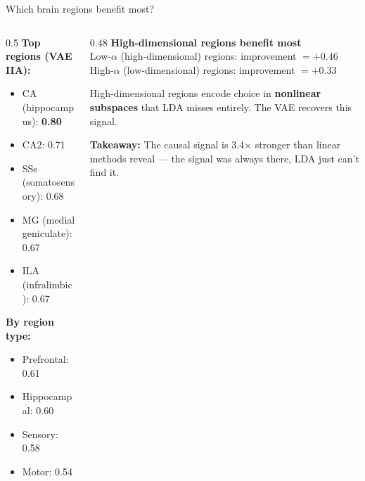 \documentclass[aspectratio=169,11pt]{beamer}
\begin{document}
\begin{frame}{Which brain regions benefit most?}
\begin{columns}[T]
\begin{column}{0.5\textwidth}
\textbf{Top regions (VAE IIA):}
\begin{itemize}\setlength\itemsep{0pt}
  \item CA (hippocampus): \textbf{0.80}
  \item CA2: 0.71
  \item SSs (somatosensory): 0.68
  \item MG (medial geniculate): 0.67
  \item ILA (infralimbic): 0.67
\end{itemize}

\vspace{0.3em}
\textbf{By region type:}
\begin{itemize}\setlength\itemsep{0pt}
  \item Prefrontal: 0.61
  \item Hippocampal: 0.60
  \item Sensory: 0.58
  \item Motor: 0.54
\end{itemize}
\end{column}
\begin{column}{0.48\textwidth}
\textbf{High-dimensional regions benefit most}\\[0.3em]
{\small Low-$\alpha$ (high-dimensional) regions: improvement $= +0.46$\\
High-$\alpha$ (low-dimensional) regions: improvement $= +0.33$}

\vspace{0.5em}
{\small High-dimensional regions encode choice in \textbf{nonlinear subspaces} that LDA misses entirely. The VAE recovers this signal.}

\vspace{0.5em}
{\small \textbf{Takeaway:} The causal signal is 3.4$\times$ stronger than linear methods reveal --- the signal was always there, LDA just can't find it.}
\end{column}
\end{columns}
\end{frame}
\end{document}
